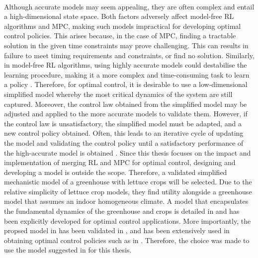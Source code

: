 \\
Although accurate models may seem appealing, they are often complex and entail a high-dimensional state space. Both factors adversely affect model-free RL algorithms and MPC, making such models impractical for developing optimal control policies. This arises because, in the case of MPC, finding a tractable solution in the given time constraints may prove challenging. This can results in failure to meet timing requirements and constraints, or find no solution. Similarly, in model-free RL algorithms, using highly accurate models could destabilise the learning procedure, making it a more complex and time-consuming task to learn a policy \cite{lawrynczukMPCAlgorithms2014,dulac-arnoldChallengesRealWorldReinforcement2019}. Therefore, for optimal control, it is desirable to use a low-dimensional simplified model whereby the most critical dynamics of the system are still captured. Moreover, the control law obtained from the simplified model may be adjusted and applied to the more accurate models to validate them. However, if the control law is unsatisfactory, the simplified model must be adapted, and a new control policy obtained. Often, this leads to an iterative cycle of updating the model and validating the control policy until a satisfactory performance of the high-accurate model is obtained \cite{knibbeDigitalTwinsGreen2022}. Since this thesis focuses on the impact and implementation of merging RL and MPC for optimal control, designing and developing a model is outside the scope.
Therefore, a validated simplified mechanistic model of a greenhouse with lettuce crops will be selected.
Due to the relative simplicity of lettuce crop models, they find utility alongside a greenhouse model that assumes an indoor homogeneous climate. A model that encapsulates the fundamental dynamics of the greenhouse and crops is detailed in \citet{hentenGreenhouseClimateManagement1994} and has been explicitly developed for optimal control applications. More importantly, the propsed model in \citet{hentenGreenhouseClimateManagement1994} has been validated in \citet{vanhentenValidationDynamicLettuce1994}, and has been extensively used in obtaining optimal control policies such as in \citet{jansenOptimalControlLettuce2023,vanstratenOptimalGreenhouseCultivation2010,ghoumariNonlinearConstrainedMPC2005,lubbersAutonomousGreenhouseClimate2023, morcegoReinforcementLearningModel2023}. Therefore, the choice was made to use the model suggested in \citet{hentenGreenhouseClimateManagement1994} for this thesis.



